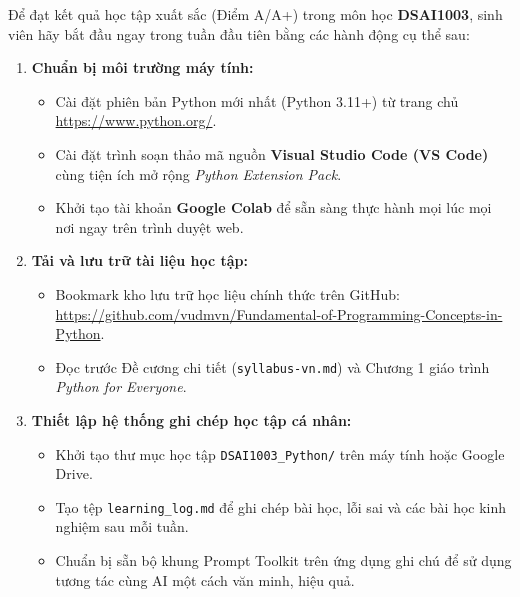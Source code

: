 \documentclass[11pt,a4paper]{article}
\begin{document}
Để đạt kết quả học tập xuất sắc (Điểm A/A+) trong môn học \textbf{DSAI1003}, sinh viên hãy bắt đầu ngay trong tuần đầu tiên bằng các hành động cụ thể sau:

\begin{enumerate}[leftmargin=1.5em, itemsep=4pt]
    \item \textbf{Chuẩn bị môi trường máy tính:}
    \begin{itemize}
        \item Cài đặt phiên bản Python mới nhất (Python 3.11+) từ trang chủ \url{https://www.python.org/}.
        \item Cài đặt trình soạn thảo mã nguồn \textbf{Visual Studio Code (VS Code)} cùng tiện ích mở rộng \textit{Python Extension Pack}.
        \item Khởi tạo tài khoản \textbf{Google Colab} để sẵn sàng thực hành mọi lúc mọi nơi ngay trên trình duyệt web.
    \end{itemize}
    \item \textbf{Tải và lưu trữ tài liệu học tập:}
    \begin{itemize}
        \item Bookmark kho lưu trữ học liệu chính thức trên GitHub: \url{https://github.com/vudmvn/Fundamental-of-Programming-Concepts-in-Python}.
        \item Đọc trước Đề cương chi tiết (\texttt{syllabus-vn.md}) và Chương 1 giáo trình \textit{Python for Everyone}.
    \end{itemize}
    \item \textbf{Thiết lập hệ thống ghi chép học tập cá nhân:}
    \begin{itemize}
        \item Khởi tạo thư mục học tập \texttt{DSAI1003\_Python/} trên máy tính hoặc Google Drive.
        \item Tạo tệp \texttt{learning\_log.md} để ghi chép bài học, lỗi sai và các bài học kinh nghiệm sau mỗi tuần.
        \item Chuẩn bị sẵn bộ khung Prompt Toolkit trên ứng dụng ghi chú để sử dụng tương tác cùng AI một cách văn minh, hiệu quả.
    \end{itemize}
\end{enumerate}

\vspace{5mm}
\end{document}

